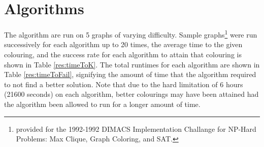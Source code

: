 \section{Algorithms}
The algorithm are run on 5 graphs of varying difficulty. Sample graphs\footnote{provided for the 1992-1992 DIMACS Implementation Challange for NP-Hard Problems: Max Clique, Graph Coloring, and SAT.} were run successively for each algorithm up to 20 times, the average time to the given colouring, and the success rate for each algorithm to attain that colouring is shown in Table \ref{res:timeToK}. The total runtimes for each algorithm are shown in Table \ref{res:timeToFail}, signifying the amount of time that the algorithm required to not find a better solution. Note that due to the hard limitation of 6 hours (21600 seconds) on each algorithm, better colourings may have been attained had the algorithm been allowed to run for a longer amount of time. 
